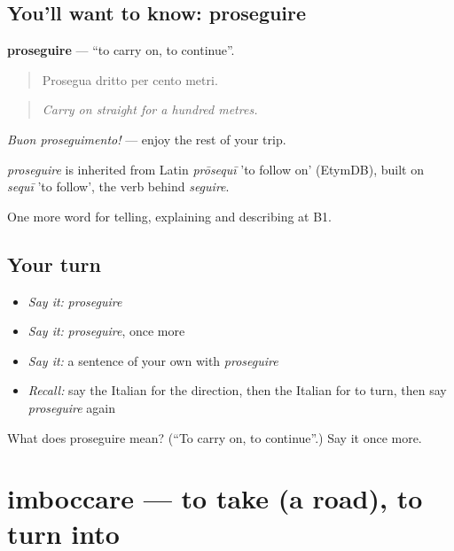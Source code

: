 \subsection*{You'll want to know: proseguire}
\textbf{proseguire} — \textquotedblleft{}to carry on, to continue\textquotedblright{}.

\begin{quote}
Prosegua dritto per cento metri.
\end{quote}

\begin{quote}
\emph{Carry on straight for a hundred metres.}
\end{quote}

\emph{Buon proseguimento!} — enjoy the rest of your trip.

\begin{cousinweb}
\emph{proseguire} is inherited from Latin \emph{prōsequī} 'to follow on' (EtymDB), built on \emph{sequī} 'to follow', the verb behind \emph{seguire}.
\end{cousinweb}

\begin{grammarlens}[title={What you've built}]
One more word for telling, explaining and describing at B1.
\end{grammarlens}

\subsection*{Your turn}
\begin{itemize}
\raggedright
  \item \emph{Say it:} \emph{proseguire}
  \item \emph{Say it:} \emph{proseguire}, once more
  \item \emph{Say it:} a sentence of your own with \emph{proseguire}
  \item \emph{Recall:} say the Italian for the direction, then the Italian for to turn, then say \emph{proseguire} again
\end{itemize}

\begin{tcolorbox}[breakable,colback=teal!4,colframe=teal!35!black,title={Before you move on}]
What does proseguire mean? (\textquotedblleft{}To carry on, to continue\textquotedblright{}.) Say it once more.
\end{tcolorbox}
\section[imboccare]{imboccare — to take (a road), to turn into}

